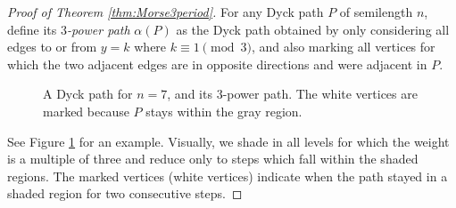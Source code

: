 \begin{proof}[Proof of Theorem \ref{thm:Morse3period}]
    For any Dyck path $P$ of semilength $n$, define its \emph{$3$-power path} $\alpha(P)$ as the Dyck path obtained by only considering all edges to or from $y=k$ where $k\equiv 1\pmod{3}$, and also marking all vertices for which the two adjacent edges are in opposite directions and were adjacent in $P$.
    \begin{figure}[h!]
    \centering
    
    \caption{A Dyck path for $n=7$, and its $3$-power path. The white vertices are marked because $P$ stays within the gray region.}
    \label{fig:powerpath}
    \end{figure}
    
    See Figure \ref{fig:powerpath} for an example. Visually, we shade in all levels for which the weight is a multiple of three and reduce only to steps which fall within the shaded regions. The marked vertices (white vertices) indicate when the path stayed in a shaded region for two consecutive steps.
    

\end{proof}
